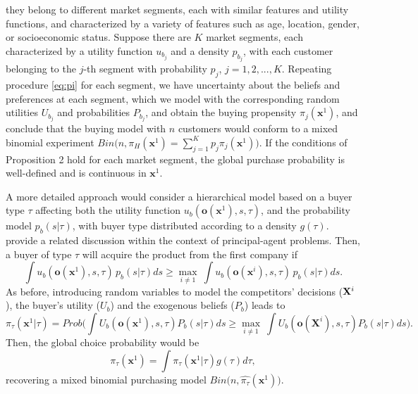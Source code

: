 \documentclass[a4paper,fleqn, 11pt]{cas-sc}
\begin{document}
 they belong to different market segments, each with 
 similar features and utility functions, and characterized by a variety of 
 features such as age, location, gender, or socioeconomic status. 
  Suppose there are $K$ market segments, each characterized by a utility function 
  $u_{b_j}$ and a density $p_{b_j}$, with each customer belonging to the $j$-th 
  segment with probability $p_j$, $j=1,2,...,K$.  Repeating procedure \eqref{eq:pi}
  for each segment, we have uncertainty about the beliefs and preferences at each segment,
  which we model with the corresponding random utilities $U_{b_j}$ and probabilities  
   $P_{b_j}$,  and obtain the buying propensity
 $\pi_j({\bm x}^1)$, and conclude that the 
  buying model with $n$ customers would conform to a
  mixed binomial experiment 
    $Bin \big(n, \pi _H ({\bm x}^1)=\sum_{j=1}^K p_j \pi_j ({\bm x}^1) \big)$.
  If the conditions of Proposition 2 hold for each market segment, the global purchase probability is well-defined
and is continuous in ${\bm x}^1$.

    

 A more detailed approach %
  would consider a hierarchical model based on a buyer type $\tau $ affecting both the utility function  
$u_b({\bm o} ({\bm x}^1), s, \tau )$, and the 
 probability model $p_b(s | \tau )$, with buyer type distributed 
 according to a density $g(\tau )$. \cite{assaf2020bayesian} 
  provide a related discussion within the context of 
  principal-agent problems. Then, a buyer of type
 $\tau $ will acquire the product from the first company if 
\begin{equation*}
    \int u_b({\bm o} ({\bm x}^1), s, \tau)\,p_b(s| \tau)ds \geq \max_{i \neq 1} ~\int  u_b({\bm o} ({\bm x}^i), s, \tau)\,p_b(s| \tau)ds .
\end{equation*}
As before, introducing random variables to model the competitors' decisions 
 (${\bf X}^i$), the buyer's utility ($U_b$)
and the exogenous beliefs ($P_b$)
leads to 
\begin{equation}
  \pi_{\tau } ({\bm x}^1| \tau) = Prob \Big(\int U_b({\bm o} ({\bm x}^1), s, \tau)P_b(s| \tau)ds \geq \max_{i \neq 1} ~\int  U_b({\bm o} ({\bm X}^i), s, \tau)P_b(s| \tau)ds\Big). 
  \label{heter}
\end{equation}
  Then, the global choice probability would be 
\begin{equation*}
\pi_{\tau } ({\bm x}^1 )  = \int   \pi_{\tau } ({\bm x}^1| \tau) g (\tau ) d \tau ,
\end{equation*}
%
recovering a mixed binomial purchasing model $Bin \big( n, \widehat{ \pi_{\tau }} ({\bm x}^1)\big)$.
\end{document}
